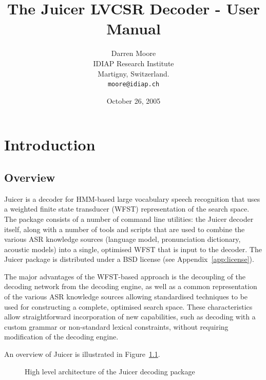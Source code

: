 \documentclass[a4paper,12pt]{report}
\title{The Juicer LVCSR Decoder - User Manual{\newline}\vspace{5mm}{\Large for Juicer version ***VER***}}
\author{Darren Moore \\
IDIAP Research Institute \\
Martigny, Switzerland. \\
{\tt moore@idiap.ch}
}
\date{October 26, 2005}
\begin{document}
\maketitle
\tableofcontents


\chapter{Introduction}

\section{Overview}

Juicer is a decoder for HMM-based large vocabulary speech recognition that uses
a weighted finite state transducer (WFST) representation of the search space. The package
consists of a number of command line utilities: the Juicer decoder itself, along
with a number of tools and scripts that are used to combine the various ASR
knowledge sources (language model, pronunciation dictionary, acoustic models)
into a single, optimised WFST that is input to the decoder. The Juicer package is distributed under a BSD license (see Appendix~\ref{app:license}).

The major advantages of the WFST-based approach is the decoupling of the decoding network from the decoding engine, as well as a common representation of the various ASR knowledge sources allowing standardised techniques to be used for constructing a complete, optimised search space. These characteristics allow straightforward incorporation of new capabilities, such as decoding with a custom grammar or non-standard lexical constraints, without requiring modification of the decoding engine.

An overview of Juicer is illustrated in Figure~\ref{fig:juicerarch}.

\begin{figure}
\begin{center}
\caption{High level architecture of the Juicer decoding package}
\label{fig:juicerarch}
\end{center}
\end{figure}
\end{document}
